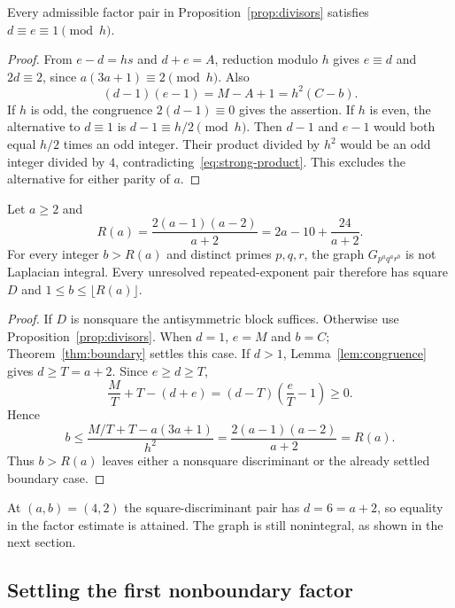 \begin{lemma}
\label{lem:congruence}
Every admissible factor pair in Proposition~\ref{prop:divisors} satisfies
$d\equiv e\equiv1\pmod h$.
\end{lemma}
\begin{proof}
From $e-d=hs$ and $d+e=A$, reduction modulo $h$ gives
$e\equiv d$ and $2d\equiv2$, since $a(3a+1)\equiv2\pmod h$.
Also
\begin{equation}
\label{eq:strong-product}
(d-1)(e-1)=M-A+1=h^2(C-b).
\end{equation}
If $h$ is odd, the congruence $2(d-1)\equiv0$ gives the assertion.
If $h$ is even, the alternative to $d\equiv1$ is
$d-1\equiv h/2\pmod h$. Then $d-1$ and $e-1$ would both equal
$h/2$ times an odd integer. Their product divided by $h^2$ would be an
odd integer divided by $4$, contradicting~\eqref{eq:strong-product}.
This excludes the alternative for either parity of $a$.
\end{proof}

\begin{theorem}
\label{thm:linear}
Let $a\geq2$ and
\[
R(a)=\frac{2(a-1)(a-2)}{a+2}=2a-10+\frac{24}{a+2}.
\]
For every integer $b>R(a)$ and distinct primes $p,q,r$, the graph
$G_{p^a q^a r^b}$ is not Laplacian integral. Every unresolved
repeated-exponent pair therefore has square $D$ and
$1\leq b\leq\lfloor R(a)\rfloor$.
\end{theorem}
\begin{proof}
If $D$ is nonsquare the antisymmetric block suffices. Otherwise use
Proposition~\ref{prop:divisors}. When $d=1$, $e=M$ and $b=C$;
Theorem~\ref{thm:boundary} settles this case.
If $d>1$, Lemma~\ref{lem:congruence} gives $d\geq T=a+2$.
Since $e\geq d\geq T$,
\[
\frac MT+T-(d+e)=(d-T)\left(\frac eT-1\right)\geq0.
\]
Hence
\[
b\leq\frac{M/T+T-a(3a+1)}{h^2}
=\frac{2(a-1)(a-2)}{a+2}=R(a).
\]
Thus $b>R(a)$ leaves either a nonsquare discriminant or the already
settled boundary case.
\end{proof}

At $(a,b)=(4,2)$ the square-discriminant pair has $d=6=a+2$,
so equality in the factor estimate is attained. The graph is still
nonintegral, as shown in the next section.

\subsection{Settling the first nonboundary factor}

